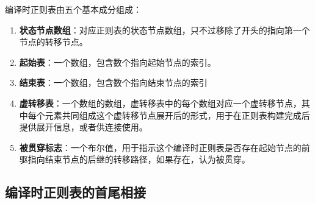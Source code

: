 \documentclass[12pt,a4paper,UTF8]{ctexart}
\begin{document}
\qquad 编译时正则表由五个基本成分组成：

\begin{enumerate}
    \item \textbf{状态节点数组}：对应正则表的状态节点数组，只不过移除了开头的指向第一个节点的转移节点。
    \item \textbf{起始表}：一个数组，包含数个指向起始节点的索引。
    \item \textbf{结束表}：一个数组，包含数个指向结束节点的索引
    \item \textbf{虚转移表}：一个数组的数组，虚转移表中的每个数组对应一个虚转移节点，其中每个元素共同组成这个虚转移节点展开后的形式，用于在正则表构建完成后提供展开信息，或者供连接使用。
    \item \textbf{被贯穿标志}：一个布尔值，用于指示这个编译时正则表是否存在起始节点的前驱指向结束节点的后继的转移路径，如果存在，认为被贯穿。
\end{enumerate}

\subsection{编译时正则表的首尾相接}
\end{document}

